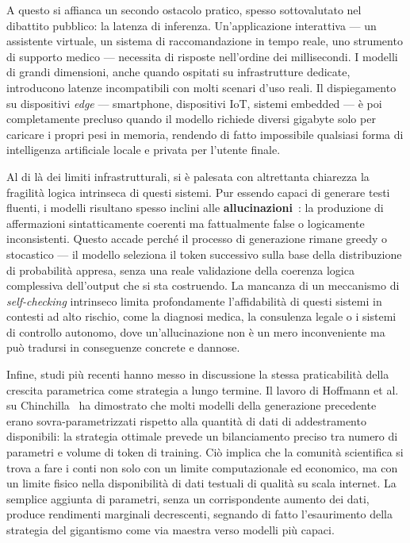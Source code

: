 A questo si affianca un secondo ostacolo pratico, spesso sottovalutato nel dibattito pubblico: la latenza di inferenza. Un'applicazione interattiva — un assistente virtuale, un sistema di raccomandazione in tempo reale, uno strumento di supporto medico — necessita di risposte nell'ordine dei millisecondi. I modelli di grandi dimensioni, anche quando ospitati su infrastrutture dedicate, introducono latenze incompatibili con molti scenari d'uso reali. Il dispiegamento su dispositivi \textit{edge} — smartphone, dispositivi IoT, sistemi embedded — è poi completamente precluso quando il modello richiede diversi gigabyte solo per caricare i propri pesi in memoria, rendendo di fatto impossibile qualsiasi forma di intelligenza artificiale locale e privata per l'utente finale.

Al di là dei limiti infrastrutturali, si è palesata con altrettanta chiarezza la fragilità logica intrinseca di questi sistemi. Pur essendo capaci di generare testi fluenti, i modelli risultano spesso inclini alle \textbf{allucinazioni}~\cite{ji2023survey}: la produzione di affermazioni sintatticamente coerenti ma fattualmente false o logicamente inconsistenti. Questo accade perché il processo di generazione rimane greedy o stocastico — il modello seleziona il token successivo sulla base della distribuzione di probabilità appresa, senza una reale validazione della coerenza logica complessiva dell'output che si sta costruendo. La mancanza di un meccanismo di \textit{self-checking} intrinseco limita profondamente l'affidabilità di questi sistemi in contesti ad alto rischio, come la diagnosi medica, la consulenza legale o i sistemi di controllo autonomo, dove un'allucinazione non è un mero inconveniente ma può tradursi in conseguenze concrete e dannose.

Infine, studi più recenti hanno messo in discussione la stessa praticabilità della crescita parametrica come strategia a lungo termine. Il lavoro di Hoffmann et al. su Chinchilla~\cite{hoffmann2022training} ha dimostrato che molti modelli della generazione precedente erano sovra-parametrizzati rispetto alla quantità di dati di addestramento disponibili: la strategia ottimale prevede un bilanciamento preciso tra numero di parametri e volume di token di training. Ciò implica che la comunità scientifica si trova a fare i conti non solo con un limite computazionale ed economico, ma con un limite fisico nella disponibilità di dati testuali di qualità su scala internet. La semplice aggiunta di parametri, senza un corrispondente aumento dei dati, produce rendimenti marginali decrescenti, segnando di fatto l'esaurimento della strategia del gigantismo come via maestra verso modelli più capaci.

